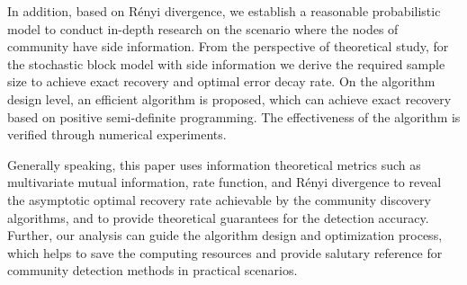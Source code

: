\begin{abstract*}
  In addition, based on Rényi divergence,
  we establish a reasonable probabilistic model
  to conduct in-depth research on the scenario
  where the nodes of community have side information.
  From the perspective of theoretical study,
  for the stochastic block model with side information
  we derive the required sample size to achieve exact recovery and optimal error decay rate.
  On the algorithm design level,
  an efficient algorithm is proposed, which can achieve exact recovery based on positive semi-definite programming.
  The effectiveness of the algorithm is verified through numerical experiments.

  Generally speaking, this paper uses information theoretical metrics
  such as multivariate mutual information,
  rate function, and Rényi divergence to reveal the asymptotic
  optimal recovery rate achievable by the community discovery algorithms,
  and to provide theoretical guarantees for the detection accuracy.
  Further, our analysis can guide the algorithm design and optimization process,
  which helps to save the computing resources and provide salutary reference
  for community detection methods in practical scenarios.
\end{abstract*}
